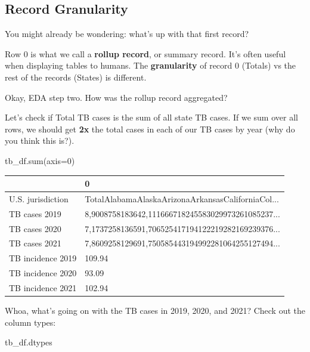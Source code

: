 \documentclass[
  letterpaper,
  DIV=11,
  numbers=noendperiod]{scrreprt}
\newenvironment{Shaded}{\begin{snugshade}}{\end{snugshade}}
\newcommand{\BuiltInTok}[1]{\textcolor[rgb]{0.00,0.23,0.31}{#1}}
\newcommand{\DecValTok}[1]{\textcolor[rgb]{0.68,0.00,0.00}{#1}}
\newcommand{\NormalTok}[1]{\textcolor[rgb]{0.00,0.23,0.31}{#1}}
\newcommand{\OperatorTok}[1]{\textcolor[rgb]{0.37,0.37,0.37}{#1}}
\begin{document}
\hypertarget{record-granularity}{%
\subsection{Record Granularity}\label{record-granularity}}

You might already be wondering: what's up with that first record?

Row 0 is what we call a \textbf{rollup record}, or summary record. It's
often useful when displaying tables to humans. The \textbf{granularity}
of record 0 (Totals) vs the rest of the records (States) is different.

Okay, EDA step two. How was the rollup record aggregated?

Let's check if Total TB cases is the sum of all state TB cases. If we
sum over all rows, we should get \textbf{2x} the total cases in each of
our TB cases by year (why do you think this is?).

\begin{Shaded}
\begin{Highlighting}[]
\NormalTok{tb\_df.}\BuiltInTok{sum}\NormalTok{(axis}\OperatorTok{=}\DecValTok{0}\NormalTok{)}
\end{Highlighting}
\end{Shaded}

\begin{tabular}{ll}
\toprule
{} &                                                  0 \\
\midrule
U.S. jurisdiction &  TotalAlabamaAlaskaArizonaArkansasCaliforniaCol... \\
TB cases 2019     &  8,9008758183642,111666718245583029973261085237... \\
TB cases 2020     &  7,1737258136591,706525417194122219282169239376... \\
TB cases 2021     &  7,8609258129691,750585443194992281064255127494... \\
TB incidence 2019 &                                             109.94 \\
TB incidence 2020 &                                              93.09 \\
TB incidence 2021 &                                             102.94 \\
\bottomrule
\end{tabular}

Whoa, what's going on with the TB cases in 2019, 2020, and 2021? Check
out the column types:

\begin{Shaded}
\begin{Highlighting}[]
\NormalTok{tb\_df.dtypes}
\end{Highlighting}
\end{Shaded}
\end{document}
